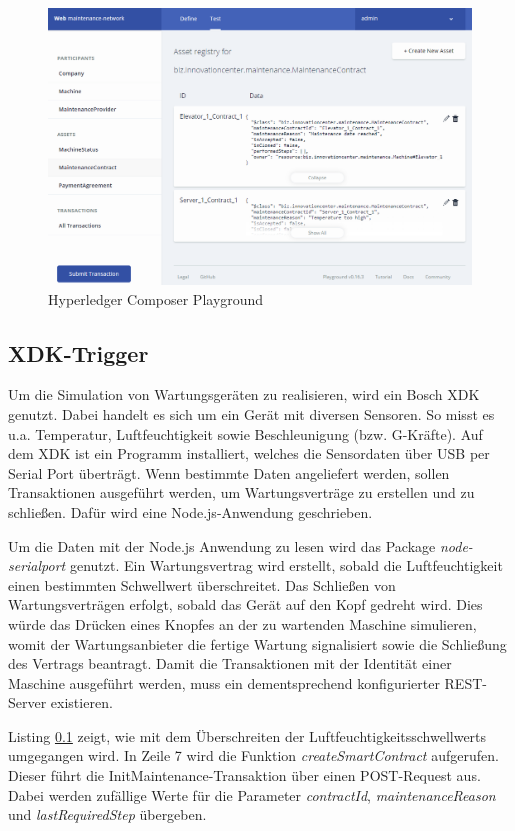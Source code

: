 \begin{figure}[htb]
    \centering
      \includegraphics[width=1.0\textwidth,angle=0]{images/playground}
       \caption{Hyperledger Composer Playground}
      \label{fig:playground}
\end{figure}

\subsection{XDK-Trigger}
Um die Simulation von Wartungsgeräten zu realisieren, wird ein Bosch XDK genutzt. Dabei handelt es sich um ein Gerät mit diversen Sensoren. So misst es u.a. Temperatur, Luftfeuchtigkeit sowie Beschleunigung (bzw. G-Kräfte). Auf dem XDK ist ein Programm installiert, welches die Sensordaten über USB per Serial Port überträgt. Wenn bestimmte Daten angeliefert werden, sollen Transaktionen ausgeführt werden, um Wartungsverträge zu erstellen und zu schließen. Dafür wird eine Node.js-Anwendung geschrieben.

Um die Daten mit der Node.js Anwendung zu lesen wird das Package \textit{node-serialport} \cite{nodeserialportGithubRepository2018} genutzt. Ein Wartungsvertrag wird erstellt, sobald die Luftfeuchtigkeit einen bestimmten Schwellwert überschreitet. Das Schließen von Wartungsverträgen erfolgt, sobald das Gerät auf den Kopf gedreht wird. Dies würde das Drücken eines Knopfes an der zu wartenden Maschine simulieren, womit der Wartungsanbieter die fertige Wartung signalisiert sowie die Schließung des Vertrags beantragt. Damit die Transaktionen mit der Identität einer Maschine ausgeführt werden, muss ein dementsprechend konfigurierter REST-Server existieren. 

Listing \ref{} zeigt, wie mit dem Überschreiten der Luftfeuchtigkeitsschwellwerts umgegangen wird. In Zeile 7 wird die Funktion \textit{createSmartContract} aufgerufen. Dieser führt die InitMaintenance-Transaktion über einen POST-Request aus. Dabei werden zufällige Werte für die Parameter \textit{contractId}, \textit{maintenanceReason} und \textit{lastRequiredStep} übergeben.


